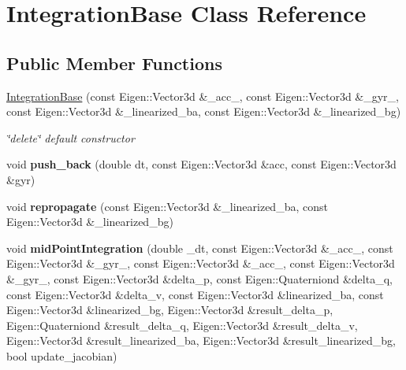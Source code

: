 \hypertarget{classIntegrationBase}{}\section{Integration\+Base Class Reference}
\label{classIntegrationBase}
\subsection*{Public Member Functions}
\begin{DoxyCompactItemize}
\item 
\hyperlink{classIntegrationBase_af4961daa1b4e999cf1edbaa4c9f81444}{Integration\+Base} (const Eigen\+::\+Vector3d \&\+\_\+acc\+\_, const Eigen\+::\+Vector3d \&\+\_\+gyr\+\_, const Eigen\+::\+Vector3d \&\+\_\+linearized\+\_\+ba, const Eigen\+::\+Vector3d \&\+\_\+linearized\+\_\+bg)
\begin{DoxyCompactList}\small\item\em \char`\"{}delete\char`\"{} default constructor \end{DoxyCompactList}\item 
\mbox{\label{classIntegrationBase_a4e34c978c8471851d86bf3921dc18454}} 
void {\bfseries push\+\_\+back} (double dt, const Eigen\+::\+Vector3d \&acc, const Eigen\+::\+Vector3d \&gyr)
\item 
\mbox{\label{classIntegrationBase_a85b741abe55b7012a6302620388fa99b}} 
void {\bfseries repropagate} (const Eigen\+::\+Vector3d \&\+\_\+linearized\+\_\+ba, const Eigen\+::\+Vector3d \&\+\_\+linearized\+\_\+bg)
\item 
\mbox{\label{classIntegrationBase_a918e7979d66c5779c7d71914c56e59cf}} 
void {\bfseries mid\+Point\+Integration} (double \+\_\+dt, const Eigen\+::\+Vector3d \&\+\_\+acc\+\_, const Eigen\+::\+Vector3d \&\+\_\+gyr\+\_, const Eigen\+::\+Vector3d \&\+\_\+acc\+\_, const Eigen\+::\+Vector3d \&\+\_\+gyr\+\_, const Eigen\+::\+Vector3d \&delta\+\_\+p, const Eigen\+::\+Quaterniond \&delta\+\_\+q, const Eigen\+::\+Vector3d \&delta\+\_\+v, const Eigen\+::\+Vector3d \&linearized\+\_\+ba, const Eigen\+::\+Vector3d \&linearized\+\_\+bg, Eigen\+::\+Vector3d \&result\+\_\+delta\+\_\+p, Eigen\+::\+Quaterniond \&result\+\_\+delta\+\_\+q, Eigen\+::\+Vector3d \&result\+\_\+delta\+\_\+v, Eigen\+::\+Vector3d \&result\+\_\+linearized\+\_\+ba, Eigen\+::\+Vector3d \&result\+\_\+linearized\+\_\+bg, bool update\+\_\+jacobian)

\end{DoxyCompactItemize}
